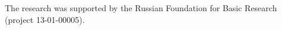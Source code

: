 


\vspace*{-20pt}

\Ack

\vspace*{-2pt}
\noindent
The research was supported by the Russian Foundation for
Basic Research (project 13-01-00005).


\vspace*{-3pt}


  \begin{multicols}{2}

\renewcommand{\bibname}{\protect\rmfamily References}



{\small\frenchspacing
 {%
 \begin{thebibliography}{99}

 \vspace*{-2pt}


\end{thebibliography}}}
\end{multicols}
